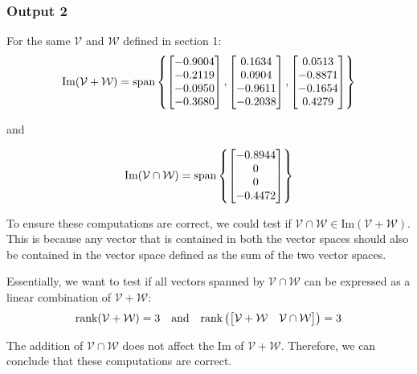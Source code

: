 \documentclass[10pt]{article}
\begin{document}
\subsubsection{Output 2}
For the same $\mathcal{V}$ and $\mathcal{W}$ defined in section 1:
\begin{equation*}
    \text{Im}({\mathcal{V} + \mathcal{W}}) = \text{span}
    \begin{Bmatrix}
        \begin{bmatrix} -0.9004\\-0.2119\\-0.0950\\-0.3680 \end{bmatrix},
        \begin{bmatrix} 0.1634\\0.0904\\-0.9611\\-0.2038 \end{bmatrix},
        \begin{bmatrix} 0.0513\\-0.8871\\-0.1654\\0.4279 \end{bmatrix}
    \end{Bmatrix}
\end{equation*}
\begin{center}
    and
\end{center}
\begin{equation*}
    \text{Im}({\mathcal{V} \cap \mathcal{W}}) = \text{span}
    \begin{Bmatrix}
        \begin{bmatrix} -0.8944\\0\\0\\-0.4472 \end{bmatrix}
    \end{Bmatrix}
\end{equation*}

To ensure these computations are correct, we could test if ${\mathcal{V} \cap \mathcal{W}} \in \text{Im}({\mathcal{V} + \mathcal{W}})$. This is because any vector that is contained in both the vector spaces should also be contained in the vector space defined as the sum of the two vector spaces.

Essentially, we want to test if all vectors spanned by ${\mathcal{V} \cap \mathcal{W}}$ can be expressed as a linear combination of $\mathcal{V} + \mathcal{W}$:
\begin{equation*}
    \text{rank}(\mathcal{V} + \mathcal{W}) = 3
    \quad
    \text{and}
    \quad
    \text{rank}\left(\begin{bmatrix} \mathcal{V} + \mathcal{W} & \mathcal{V} \cap \mathcal{W} \end{bmatrix}\right) = 3
\end{equation*}

The addition of $\mathcal{V} \cap \mathcal{W}$ does not affect the $\text{Im}$ of $\mathcal{V} + \mathcal{W}$. Therefore, we can conclude that these computations are correct.
\end{document}

